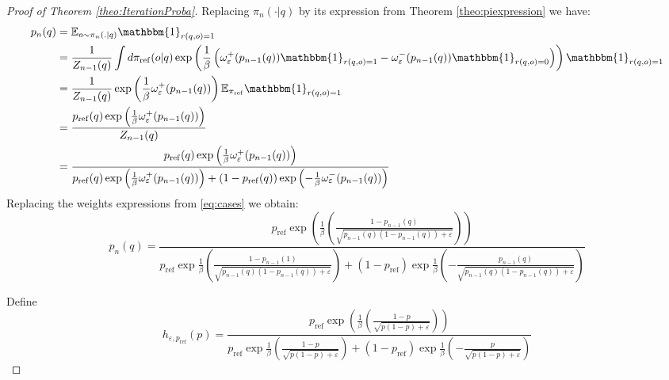 \documentclass[11pt,reqno]{amsart}
\begin{document}
\begin{proof} [Proof of Theorem \ref{theo:IterationProba}] Replacing $\pi_n(\cdot|q)$ by its expression from Theorem \ref{theo:piexpression} we have:
\begin{align*}
p_{n}(q) & = \mathbb{E}_{ o\sim \pi_{n}(.|q)} \mathbbm{1}_{r(q,o)=1}\\
& = \frac{1}{Z_{n-1}(q)} \int d\pi_{\mathrm{ref}}(o|q) \exp \left(\frac{1}{\beta} \left( \omega^+_{\varepsilon}(p_{n-1}(q)) \mathbbm{1}_{r(q,o)=1}  - \omega^-_{\varepsilon}(p_{n-1}(q))   \mathbbm{1}_{r(q,o)=0} \right) \right) \mathbbm{1}_{r(q,o)=1}  \\
& = \frac{1}{Z_{n-1}(q)} \exp\left( \frac{1}{\beta} \omega^+_{\varepsilon}(p_{n-1} (q)) \right) \mathbb{E}_{\pi_{\mathrm{ref}}} \mathbbm{1}_{r(q,o)=1}\\
& = \frac{p_{\mathrm{ref}} (q) \exp\left( \frac{1}{\beta} \omega^+_{\varepsilon}(p_{n-1} (q)) \right)}{Z_{n-1}(q)}\\
& = \frac{p_{\mathrm{ref}} (q) \exp\left( \frac{1}{\beta} \omega^+_{\varepsilon}(p_{n-1} (q)) \right)}{ p_{\mathrm{ref}}(q)\exp \left(\frac{1}{\beta} \omega^+_{\varepsilon}(p_{n-1}(q))\right) + (1-p_{\mathrm{ref}}(q ))  \exp \left(-\frac{1}{\beta} \omega^-_{\varepsilon}(p_{n-1}(q))\right) }
\end{align*}
Replacing the weights expressions from \eqref{eq:cases} we obtain: 
\begin{equation}
p_{n}(q) = \frac{p_{\mathrm{ref}}\exp\left (\frac{1}{\beta} \left( \frac{1-p_{n-1} (q)}{\sqrt{p_{n-1}(q) (1-p_{n-1}(q)) + \varepsilon}} \right )\right) }{ p_{\mathrm{ref}}\exp \frac{1}{\beta} \left( \frac{1-p_{n-1}(1)}{\sqrt{p_{n-1}(q) (1-p_{n-1}(q)) + \varepsilon}} \right)   +  (1-p_{\mathrm{ref}})  \exp \frac{1}{\beta} \left( - \frac{p_{n-1}(q)}{\sqrt{p_{n-1}(q)(1-p_{n-1}(q)) + \varepsilon}} \right)  }
\end{equation}

Define \[ h_{\varepsilon,p_{\mathrm{ref}}}(p) = \frac{p_{\mathrm{ref}} \exp\left (\frac{1}{\beta} \left( \frac{1-p}{\sqrt{p (1-p) + \varepsilon}} \right )\right) }{ p_{\mathrm{ref}}\exp \frac{1}{\beta} \left( \frac{1-p}{\sqrt{p (1-p) + \varepsilon}} \right)   +  (1-p_{\mathrm{ref}})  \exp \frac{1}{\beta} \left( - \frac{p}{\sqrt{p(1-p) + \varepsilon}} \right)  }
\]


\end{proof}
\end{document}
